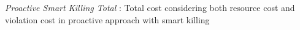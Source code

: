 \textit{Proactive Smart Killing Total} : Total cost considering both resource cost and violation cost in proactive approach with smart killing